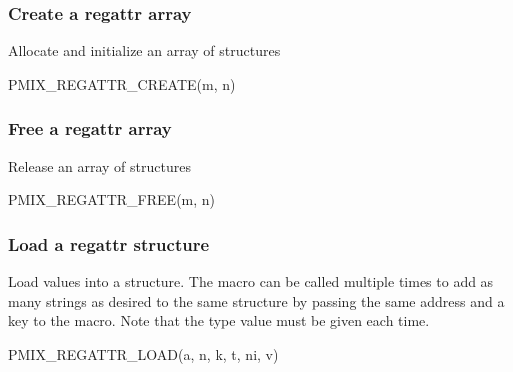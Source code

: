 \subsubsection{Create a regattr array}

Allocate and initialize an array of  structures

\cspecificstart
\begin{codepar}
PMIX_REGATTR_CREATE(m, n)
\end{codepar}
\cspecificend

\begin{arglist}
\end{arglist}

\subsubsection{Free a regattr array}

Release an array of  structures

\cspecificstart
\begin{codepar}
PMIX_REGATTR_FREE(m, n)
\end{codepar}
\cspecificend

\begin{arglist}
\end{arglist}

\subsubsection{Load a regattr structure}

Load values into a  structure. The macro can be called multiple times to add as many strings as desired to the same structure by passing the same address and a  key to the macro. Note that the  type value must be given each time.

\cspecificstart
\begin{codepar}
PMIX_REGATTR_LOAD(a, n, k, t, ni, v)
\end{codepar}
\cspecificend

